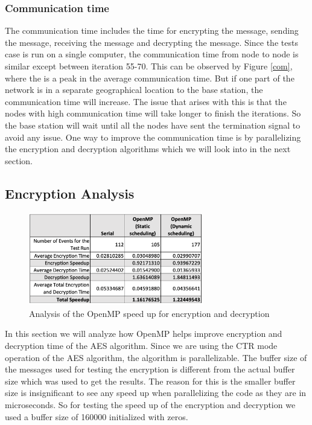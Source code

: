 \documentclass[conference]{IEEEtran}
\begin{document}
	\subsubsection{Communication time}
	
	The communication time includes the time for encrypting the message, sending the message, receiving the message and decrypting the message. Since the tests case is run on a single computer, the communication time from node to node is similar except between iteration 55-70. This can be observed by Figure \ref{com}, where the is a peak in the average communication time. But if one part of the network is in a separate geographical location to the base station, the communication time will increase. The issue that arises with this is that the nodes with high communication time will take longer to finish the iterations. So the base station will wait until all the nodes have sent the termination signal to avoid any issue. One way to improve the communication time is by parallelizing the encryption and decryption algorithms which we will look into in the next section.

	\subsection{Encryption Analysis}	\label{encry}
	
		
	 \begin{figure}[!h]
	\centering
	\includegraphics[width=3in,keepaspectratio]{speed}
	\caption{Analysis of the OpenMP speed up for encryption and decryption}
	\label{speedup}
	\end{figure}
	
	In this section we will analyze how OpenMP helps improve encryption and decryption time of the AES algorithm. Since we are using the CTR mode operation of the AES algorithm, the algorithm is parallelizable. 	The buffer size of the messages used for testing the encryption is different from the actual buffer size which was used to get the results. The reason for this is the smaller buffer size is insignificant to see any speed up when parallelizing the code as they are in microseconds. So for testing the speed up of the encryption and decryption we used a buffer size of 160000 initialized with zeros.
	
\end{document}
